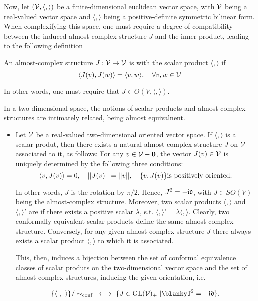 Now, let $(\mathcal{V}, \langle , \rangle)$ be a finite-dimensional euclidean vector space, with $\mathcal{V}$ being a real-valued vector space and $\langle, \rangle$ being a positive-definite symmetric bilinear form. 
When complexifying this space, one must require a degree of compatibility between the induced 
almost-complex structure $J$ and the inner product, leading to the following definition \smallbreak

\begin{mdframed}[style=MyFrame]
\begin{df}
    An almost-complex structure $J: \mathcal{V} \rightarrow \mathcal{V}$ is  with the scalar product $\langle, \rangle$ if 
    $$
        \langle J(v), J(w) \rangle = \langle v, w \rangle, \quad \forall v, w \in \mathcal{V}
    $$
    
    In other words, one must require that $J \in O(V, \langle, \rangle)$.
\end{df}    
\end{mdframed}

In a two-dimensional space, the notions of scalar products and almost-complex structures are intimately related, being almost equivalnent. 

\begin{remark}
\end{remark}

\begin{itemize}
    \item Let $\mathcal{V}$ be a real-valued two-dimensional oriented vector space. If $\langle , \rangle$ is a scalar produt, then there exists a natural almost-complex structure $J$ on $\mathcal{V}$ associated to it, as follows:
    For any $v \in \mathcal{V}-{{\bf 0}}$, the vector $J(v) \in \mathcal{V}$ is uniquely determined by the following three conditions:
        \[
            \langle v , J(v) \rangle = 0, \quad ||J(v)|| = ||v||, \quad \{v, J(v)\} \textnormal{is positively oriented}.
        \]

    In other words, $J$ is the rotation by $\pi/2$. 
    Hence, $J^{2} = -\mathfrak{i}\mathfrak{d}$, with $J \in SO(V)$ being the almost-complex structure. Moreover, two scalar products $\langle ,\rangle$ and $\langle ,\rangle'$ are  if there exists a positive scalar $\lambda$, s.t. 
    $\langle ,\rangle' = \lambda \langle ,\rangle$. 
    Clearly, two conformally equivalent scalar products define the same almost-complex structure. 
    Conversely, for any given almost-complex structure $J$ there always exists a scalar product $\langle ,\rangle$ to which it is associated. \bigbreak
    
    This, then, induces a bijection between the set of conformal equivalence classes of scalar produts on the two-dimensional vector space and the set of almost-complex structures, inducing the given orientation, i.e.

    $$
        \{ \langle \blanky, \blanky \rangle \}/\sim_{\textnormal{conf}} \blanky \longleftrightarrow \blanky \{J \in \generallineargroup(\vectorspace)_{+}\blanky | \blankyJ^2 = -\idop\}.
    $$    
\end{itemize}

